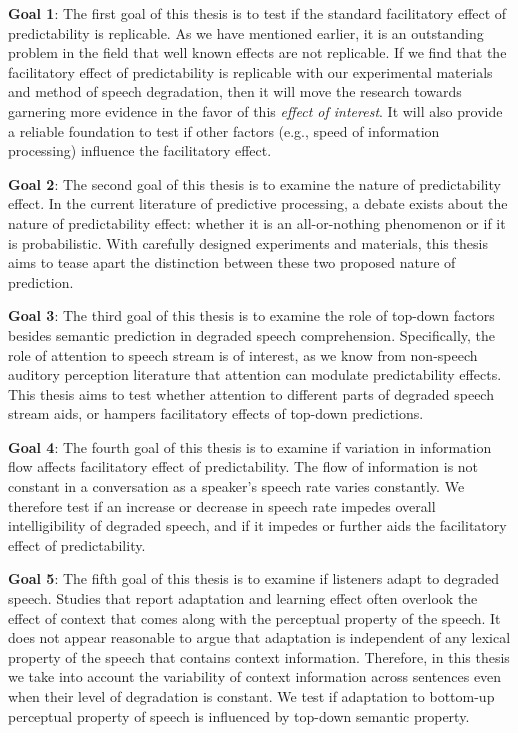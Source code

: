 \documentclass[a4paper, nobind]{templates/ociamthesis}
\begin{document}
\textbf{Goal 1}:
The first goal of this thesis is to test if the standard facilitatory effect of predictability is replicable.
As we have mentioned earlier, it is an outstanding problem in the field that well known effects are not replicable.
If we find that the facilitatory effect of predictability is replicable with our experimental materials and method of speech degradation, then it will move the research towards garnering more evidence in the favor of this \emph{effect of interest}.
It will also provide a reliable foundation to test if other factors (e.g., speed of information processing) influence the facilitatory effect.

\textbf{Goal 2}:
The second goal of this thesis is to examine the nature of predictability effect.
In the current literature of predictive processing, a debate exists about the nature of predictability effect:
whether it is an all-or-nothing phenomenon or if it is probabilistic.
With carefully designed experiments and materials, this thesis aims to tease apart the distinction between these two proposed nature of prediction.

\textbf{Goal 3}:
The third goal of this thesis is to examine the role of top-down factors besides semantic prediction in degraded speech comprehension.
Specifically, the role of attention to speech stream is of interest, as we know from non-speech auditory perception literature that attention can modulate predictability effects.
This thesis aims to test whether attention to different parts of degraded speech stream aids, or hampers facilitatory effects of top-down predictions.

\textbf{Goal 4}:
The fourth goal of this thesis is to examine if variation in information flow affects facilitatory effect of predictability.
The flow of information is not constant in a conversation as a speaker's speech rate varies constantly.
We therefore test if an increase or decrease in speech rate impedes overall intelligibility of degraded speech,
and if it impedes or further aids the facilitatory effect of predictability.

\textbf{Goal 5}:
The fifth goal of this thesis is to examine if listeners adapt to degraded speech.
Studies that report adaptation and learning effect often overlook the effect of context that comes along with the perceptual property of the speech.
It does not appear reasonable to argue that adaptation is independent of any lexical property of the speech that contains context information.
Therefore, in this thesis we take into account the variability of context information across sentences even when their level of degradation is constant.
We test if adaptation to bottom-up perceptual property of speech is influenced by top-down semantic property.
\end{document}
